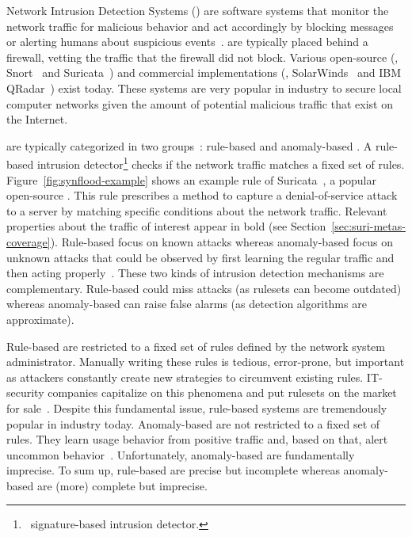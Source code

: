 \documentclass[runningheads]{llncs}
\begin{document}
Network Intrusion Detection Systems (\nids{}) are software systems
that monitor the network traffic for malicious behavior and act
accordingly by blocking messages or alerting humans about suspicious
events~\cite{Mitchell:2014:SID:2597757.2542049}. \nids{} are typically
placed behind a firewall, vetting the traffic that the firewall did
not block. Various open-source (\eg{}, Snort~\cite{snort} and
Suricata~\cite{suricata}) and commercial \nids implementations (\eg{},
SolarWinds~\cite{solarwinds} and IBM QRadar~\cite{qradar}) exist
today. These systems are very popular in industry to secure local
computer networks given the amount of potential malicious traffic that
exist on the Internet.

\sloppy \nids{} are typically categorized in two
groups~\cite{kumar2007survey}: rule-based and anomaly-based \nids. A
rule-based intrusion detector\footnote{\aka\ signature-based intrusion
  detector.} checks if the network traffic matches a fixed set of
rules. Figure~\ref{fig:synflood-example} shows an example rule of
Suricata~\cite{suricata}, a popular open-source \nids{}. This rule
prescribes a method to capture a denial-of-service
attack~\cite{understanding-dos} to a server by matching specific
conditions about the network traffic. Relevant properties about the
traffic of interest appear in bold (see
Section~\ref{sec:suri-metas-coverage}). Rule-based \nids{} focus on
known attacks whereas anomaly-based \nids{} focus on unknown attacks
that could be observed by first learning the regular traffic and then
acting
properly~\cite{kumar2007survey,Mitchell:2014:SID:2597757.2542049,cordy-etal-issta19}. These
two kinds of intrusion detection mechanisms are
complementary. Rule-based \nids could miss attacks (as rulesets can
become outdated) whereas anomaly-based \nids can raise false alarms (as
detection algorithms are approximate).

Rule-based \nids are restricted to a fixed set of rules defined by the
network system administrator. Manually writing these rules is tedious,
error-prone, but important as attackers constantly create new
strategies to circumvent existing rules. IT-security companies
capitalize on this phenomena and put rulesets on the market for
sale~\cite{proofpoint-etpro,snort-rule-subscriptions}.  Despite this
fundamental issue, rule-based systems are tremendously popular in
industry today. Anomaly-based \nids are not restricted to a fixed set
of rules. They learn usage behavior from positive traffic and, based
on that, alert uncommon behavior~\cite{7579764}. Unfortunately,
anomaly-based \nids are fundamentally imprecise. To sum up, rule-based
\nids are precise but incomplete whereas anomaly-based \nids are (more)
complete but imprecise.
\end{document}
